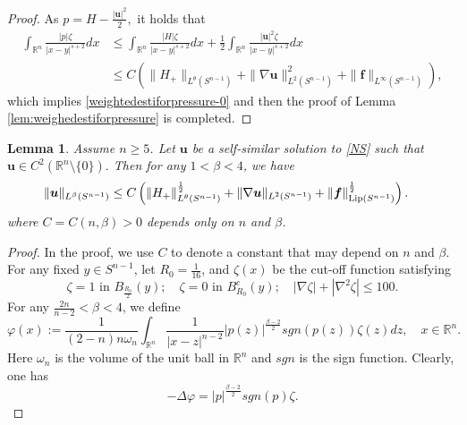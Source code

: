 \documentclass[12pt]{amsart}
\newtheorem{lemma}[theorem]{Lemma}
\newcommand{\Bu}{{\boldsymbol{u}}}
\newcommand{\Bf}{{\boldsymbol{f}}}
\begin{document}
{\begin{proof}
		As $p=H-\frac{|\Bu|^{2}}{2},$ it holds that
		\begin{align*}
			\int_{\mathbb{R}^{n}}\frac{|p|\zeta}{|x-y|^{s+2}} dx &\le\int_{\mathbb{R}^{n}}\frac{|H|\zeta}{|x-y|^{s+2}} dx +\frac{1}{2}\int_{\mathbb{R}^{n}}\frac{|\Bu|^{2}\zeta}{|x-y|^{s+2}}dx  \\
			&\le C\left(\|H_{+}\|_{L^{\theta}(S^{n-1})}+	 \|\nabla \Bu\|_{L^{2}(S^{n-1})}^2+\|\Bf\|_{L^{\infty}(S^{n-1})}\right),
		\end{align*}
		which implies \eqref{weightedestiforpressure-0} and then  the proof of Lemma \ref{lem:weighedestiforpressure} is completed.
	\end{proof}
	\begin{lemma}\label{highintegralofu}
		Assume $n\geq 5$. Let $\Bu$ be a self-similar solution to \eqref{NS} such that $\Bu \in C^2(\mathbb{R}^n \setminus\{0\}).$ Then for any $1<\beta <4$,  we have
		\begin{align}\label{highintegralofu-0}
			\|\Bu\|_{L^\beta(S^{n-1})}
			&\leq C\left(\|H_{+}\|_{L^{\theta}(S^{n-1})}^{\frac{1}{2}} + \|\nabla \Bu\|_{L^2(S^{n-1})} + \|\Bf\|_{\textnormal{Lip}(S^{n-1}) }^{\frac12} \right).
		\end{align}
		where $C=C(n,\beta)>0$ depends only on $n$ and  $\beta$.
	\end{lemma}
	
	\begin{proof}  
		In the proof, we use $C$ to denote a constant that may depend on $n$ and $\beta$. For any fixed $y\in S^{n-1}$, let $R_0= \frac{1}{16}$, and $\zeta(x)$ be the  cut-off function  satisfying
		$$ \zeta=1 \text{ in } B_{\frac{R_0}{2}}(y); \quad \zeta=0 \text{ in } B_{R_{0}}^{c}(y); \quad |\nabla\zeta|+|\nabla^{2}\zeta|\le 100. $$
		For any $\frac{2n}{n-2}< \beta < 4$,  we define
		$$ \varphi(x):=\frac{1}{(2-n)n\omega_n}\int_{\mathbb{R}^{n}}\frac{1}{|x-z|^{n-2}}|p(z)|^{\frac{\beta-2}{2}}sgn(p(z))\zeta(z)dz, \quad x\in\mathbb{R}^{n}. $$
		Here $\omega_n$ is the volume of the unit ball in $\mathbb{R}^n$ and $sgn$ is the sign function. Clearly, one has
		\begin{equation}\label{laplacianofpressure}
			-\Delta\varphi=|p|^{\frac{\beta-2}{2}}sgn(p)\zeta. 
		\end{equation}
		

\end{proof}}
\end{document}
